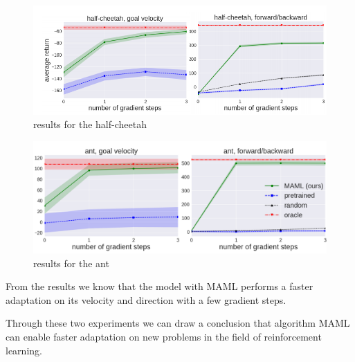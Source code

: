 \begin{figure}[H]
	\includegraphics[scale=0.5]{MAML_05.PNG}
	\centering
	\caption{results for the half-cheetah}
	\label{MAML}
\end{figure}

\begin{figure}[H]
	\includegraphics[scale=0.27]{MAML_06.PNG}
	\centering
	\caption{results for the ant}
	\label{MAML}
\end{figure}

From the results we know that the model with MAML performs a faster adaptation on its velocity and direction with a few gradient steps.

Through these two experiments we can draw a conclusion that algorithm MAML can enable faster adaptation on new problems in the field of reinforcement learning. 
